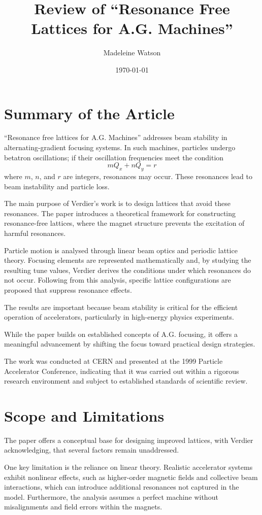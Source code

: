 \documentclass[twocolumn,10pt,a4paper]{article}
\title{\textbf{Review of ``Resonance Free Lattices for A.G. Machines''}}
\author{Madeleine Watson}
\date{\today}
\begin{document}
\maketitle

\section{Summary of the Article}
``Resonance free lattices for A.G. Machines'' \cite{verdier1999} addresses beam stability in alternating-gradient focusing systems. In such machines, particles undergo betatron oscillations; if their oscillation frequencies meet the condition $$mQ_x+nQ_y=r$$ where $m$, $n$, and $r$ are integers, resonances may occur. These resonances lead to beam instability and particle loss.

The main purpose of Verdier's work is to design lattices that avoid these resonances. The paper introduces a theoretical framework for constructing resonance-free lattices, where the magnet structure prevents the excitation of harmful resonances.

Particle motion is analysed through linear beam optics and periodic lattice theory. Focusing elements are represented mathematically and, by studying the resulting tune values, Verdier derives the conditions under which resonances do not occur. Following from this analysis, specific lattice configurations are proposed that suppress resonance effects.

The results are important because beam stability is critical for the efficient operation of accelerators, particularly in high-energy physics experiments. 

While the paper builds on established concepts of A.G. focusing, it offers a meaningful advancement by shifting the focus toward practical design strategies.

The work was conducted at CERN and presented at the 1999 Particle Accelerator Conference, indicating that it was carried out within a rigorous research environment and subject to established standards of scientific review.

\section{Scope and Limitations}

The paper offers a conceptual base for designing improved lattices, with Verdier acknowledging, that several factors remain unaddressed.

One key limitation is the reliance on linear theory. Realistic accelerator systems exhibit nonlinear effects, such as higher-order magnetic fields and collective beam interactions, which can introduce additional resonances not captured in the model. Furthermore, the analysis assumes a perfect machine without misalignments and field errors within the magnets.
\end{document}
